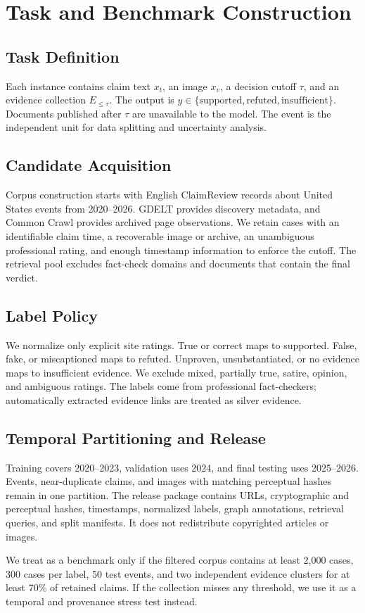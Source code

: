 \section{Task and Benchmark Construction}

\subsection{Task Definition}

Each instance contains claim text $x_t$, an image $x_v$, a decision cutoff $\tau$, and an evidence collection $E_{\leq\tau}$. The output is $y \in \{\text{supported},\text{refuted},\text{insufficient}\}$. Documents published after $\tau$ are unavailable to the model. The event is the independent unit for data splitting and uncertainty analysis.

\subsection{Candidate Acquisition}

Corpus construction starts with English ClaimReview records about United States events from 2020--2026. GDELT provides discovery metadata, and Common Crawl provides archived page observations. We retain cases with an identifiable claim time, a recoverable image or archive, an unambiguous professional rating, and enough timestamp information to enforce the cutoff. The retrieval pool excludes fact-check domains and documents that contain the final verdict.

\subsection{Label Policy}

We normalize only explicit site ratings. True or correct maps to supported. False, fake, or miscaptioned maps to refuted. Unproven, unsubstantiated, or no evidence maps to insufficient evidence. We exclude mixed, partially true, satire, opinion, and ambiguous ratings. The labels come from professional fact-checkers; automatically extracted evidence links are treated as silver evidence.

\subsection{Temporal Partitioning and Release}

Training covers 2020--2023, validation uses 2024, and final testing uses 2025--2026. Events, near-duplicate claims, and images with matching perceptual hashes remain in one partition. The release package contains URLs, cryptographic and perceptual hashes, timestamps, normalized labels, graph annotations, retrieval queries, and split manifests. It does not redistribute copyrighted articles or images.

We treat \datasetname{} as a benchmark only if the filtered corpus contains at least 2,000 cases, 300 cases per label, 50 test events, and two independent evidence clusters for at least 70\% of retained claims. If the collection misses any threshold, we use it as a temporal and provenance stress test instead.


